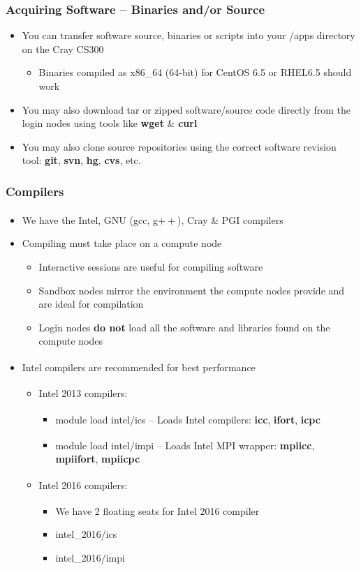 \documentclass[t,hyperref={pdfpagelabels=false}]{beamer}
\newcommand{\ctilde}{{\fontfamily{ptm}\selectfont\texttildelow}}
\newcommand{\regtrademark}{\fontsize{5}{6}\selectfont \textsuperscript{\textregistered}}
\newcommand{\intel}{Intel{\regtrademark}}
\newcommand{\cray}{Cray{\regtrademark}}
\begin{document}
\begin{frame}
	\frametitle{Acquiring Software -- Binaries and/or Source}
	\begin{itemize}
		\item	You can transfer software source, binaries or scripts into your \ctilde{}/apps directory on the Cray CS300
		\begin{itemize}
			\item Binaries compiled as x86\_64 (64-bit) for CentOS 6.5 or RHEL6.5 should work
		\end{itemize}
		\item You may also download tar or zipped software/source code directly from the login nodes using tools like \textbf{wget} \& \textbf{curl}
		\item You may also clone source repositories using the correct software revision tool: \textbf{git}, \textbf{svn}, \textbf{hg}, \textbf{cvs}, etc.
	\end{itemize}
\end{frame}


\begin{frame}
\frametitle{Compilers}
	\begin{itemize}
		\item We have the {\intel}, GNU (gcc, g$++$), {\cray} \& PGI{\regtrademark} compilers
		\item Compiling must take place on a compute node
		\begin{itemize}
			\item Interactive sessions are useful for compiling software
			\item Sandbox nodes mirror the environment the compute nodes provide and are ideal for compilation
			\item Login nodes \textbf{do not} load all the software and libraries found on the compute nodes
		\end{itemize}
		\item {\intel} compilers are recommended for best performance
		\begin{itemize}
			\item {\intel} 2013 compilers:
			\begin{itemize}
				\item module load intel/ics -- Loads {\intel} compilers: {\tiny \textbf{icc}, \textbf{ifort}, \textbf{icpc}}
				\item module load intel/impi -- Loads {\intel} MPI wrapper: {\tiny\textbf{mpiicc}, \textbf{mpiifort}, \textbf{mpiicpc}}
			\end{itemize}
			\item {\intel} 2016 compilers:
			\begin{itemize}
				\item We have 2 floating seats for {\intel} 2016 compiler
				\item intel\_2016/ics 
				\item intel\_2016/impi 
			\end{itemize}
		\end{itemize}			
	\end{itemize}
\end{frame}
\end{document}
